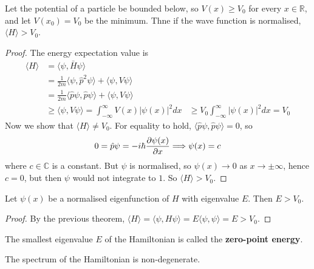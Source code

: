 \begin{theorem}
	Let the potential of a particle be bounded below, so $V(x) \ge V_0$ for every $x \in \mathbb{R}$, and let $V(x_0) = V_0$ be the minimum. Thne if the wave function is normalised, $\langle H \rangle > V_0$.
\end{theorem}

\begin{proof}
	The energy expectation value is
	\[
		\begin{aligned}
			\langle H \rangle & = \langle \psi, \bar{H} \psi \rangle \\
			& = \frac{1}{2m} \langle \psi, \hat{p}^2 \psi \rangle + \langle \psi, V \psi \rangle \\
			& = \frac{1}{2m} \langle \hat{p} \psi, \hat{p} \psi \rangle + \langle \psi, V \psi \rangle \\
			& \ge \langle \psi, V \psi \rangle = \int_{-\infty}^{\infty} V(x) |\psi(x)|^2 dx
			& \ge V_0 \int_{-\infty}^{\infty} |\psi(x)|^2 dx = V_0
		\end{aligned}
	\]
	Now we show that $\langle H \rangle \ne V_0$. For equality to hold, $\langle \hat{p} \psi, \hat{p} \psi \rangle = 0$, so
	\[
		0 = \hat{p} \psi = -i\hbar \diffp{\psi(x)}{x} \Longrightarrow \psi(x) = c
	\]
	where $c \in \mathbb{C}$ is a constant. But $\psi$ is normalised, so $\psi(x) \to 0$ as $x \to \pm\infty$, hence $c = 0$, but then $\psi$ would not integrate to $1$. So $\langle H \rangle > V_0$.
\end{proof}

\begin{corollary}
	Let $\psi(x)$ be a normalised eigenfunction of $H$ with eigenvalue $E$. Then $E > V_0$.
\end{corollary}

\begin{proof}
	By the previous theorem, $\langle H \rangle = \langle \psi, H \psi \rangle = E \langle \psi, \psi \rangle = E > V_0$.
\end{proof}

\begin{definition}
	The smallest eigenvalue $E$ of the Hamiltonian is called the \textbf{zero-point energy}.
\end{definition}

\begin{theorem}
	The spectrum of the Hamiltonian is non-degenerate.
\end{theorem}

